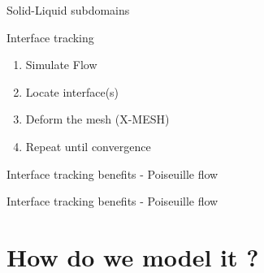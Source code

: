 \documentclass{beamer}  %
\newcommand{\vv}{\mathbf{v}}
\begin{document}
\begin{frame}{Solid-Liquid subdomains}
\begin{figure}
    \end{figure}
\end{frame}

\begin{frame}{Interface tracking}
    \begin{enumerate}
        \item Simulate Flow
        \item Locate interface(s)
        \item Deform the mesh (X-MESH)
        \item Repeat until convergence
    \end{enumerate}
\end{frame}

\begin{frame}{Interface tracking benefits - Poiseuille flow}
    \begin{figure}
        \centering
        
    \end{figure}
\end{frame}

\begin{frame}{Interface tracking benefits - Poiseuille flow}
    \begin{figure}
        \begin{overprint}
            \end{overprint} 
    \end{figure}
\end{frame}


\section{How do we model it ?}
\end{document}
